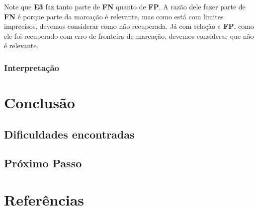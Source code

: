 \documentclass[11pt]{report}
\begin{document}
Note que \textbf{E3} faz tanto parte de \textbf{FN} quanto de \textbf{FP}. A razão dele fazer parte de \textbf{FN} é porque parte da marcação é relevante, mas como está com limites imprecisos, devemos considerar como não recuperada. Já com relação a \textbf{FP}, como ele foi recuperado com erro de fronteira de marcação, devemos considerar que não é relevante.

\subsection{Interpretação}

\pagebreak
\chapter{Conclusão}
\section{Dificuldades encontradas}
\section{Próximo Passo}

\pagebreak
\chapter*{Referências}
\end{document}
